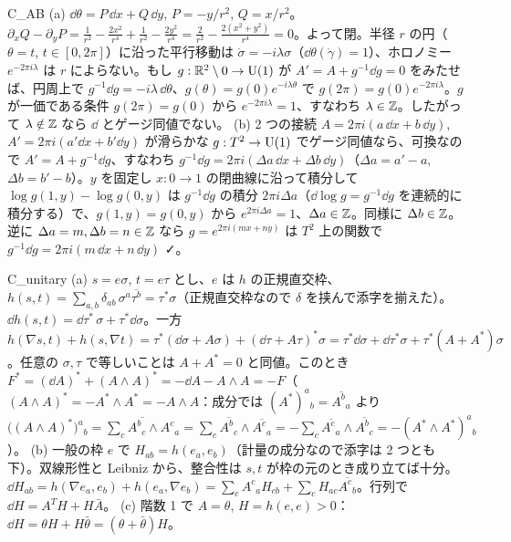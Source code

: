 \begin{soll}{C_AB}
(a) $\dd\theta=P\,\dd x+Q\,\dd y$, $P=-y/r^2$, $Q=x/r^2$。$\partial_xQ-\partial_yP=\frac1{r^2}-\frac{2x^2}{r^4}+\frac1{r^2}-\frac{2y^2}{r^4}=\frac2{r^2}-\frac{2(x^2+y^2)}{r^4}=0$。よって閉。半径 $r$ の円（$\theta=t$, $t\in[0,2\pi]$）に沿った平行移動は $\dot\sigma=-i\lambda\sigma$（$\dd\theta(\dot\gamma)=1$）、ホロノミー $e^{-2\pi i\lambda}$ は $r$ によらない。もし $g:\mathbb R^2\setminus0\to\mathrm{U}(1)$ が $A'=A+g^{-1}\dd g=0$ をみたせば、円周上で $g^{-1}\dd g=-i\lambda\,\dd\theta$、$g(\theta)=g(0)e^{-i\lambda\theta}$ で $g(2\pi)=g(0)e^{-2\pi i\lambda}$。$g$ が一価である条件 $g(2\pi)=g(0)$ から $e^{-2\pi i\lambda}=1$、すなわち $\lambda\in\mathbb Z$。したがって $\lambda\notin\mathbb Z$ なら $\dd$ とゲージ同値でない。
(b) 2 つの接続 $A=2\pi i(a\,\dd x+b\,\dd y)$, $A'=2\pi i(a'\dd x+b'\dd y)$ が滑らかな $g:T^2\to\mathrm{U}(1)$ でゲージ同値なら、可換なので $A'=A+g^{-1}\dd g$、すなわち $g^{-1}\dd g=2\pi i(\Delta a\,\dd x+\Delta b\,\dd y)$（$\Delta a=a'-a$, $\Delta b=b'-b$）。$y$ を固定し $x:0\to1$ の閉曲線に沿って積分して $\log g(1,y)-\log g(0,y)$ は $g^{-1}\dd g$ の積分 $2\pi i\Delta a$（$\dd\log g=g^{-1}\dd g$ を連続的に積分する）で、$g(1,y)=g(0,y)$ から $e^{2\pi i\Delta a}=1$、$\Delta a\in\mathbb Z$。同様に $\Delta b\in\mathbb Z$。逆に $\Delta a=m,\Delta b=n\in\mathbb Z$ なら $g=e^{2\pi i(mx+ny)}$ は $T^2$ 上の関数で $g^{-1}\dd g=2\pi i(m\,\dd x+n\,\dd y)$ ✓。
\end{soll}

\begin{soll}{C_unitary}
(a) $s=e\sigma$, $t=e\tau$ とし、$e$ は $h$ の正規直交枠、$h(s,t)=\sum_{a,b}\delta_{ab}\,\sigma^a\overline{\tau^b}=\tau^*\sigma$（正規直交枠なので $\delta$ を挟んで添字を揃えた）。$\dd h(s,t)=\dd\tau^*\,\sigma+\tau^*\dd\sigma$。一方 $h(\nabla s,t)+h(s,\nabla t)=\tau^*(\dd\sigma+A\sigma)+(\dd\tau+A\tau)^*\sigma=\tau^*\dd\sigma+\dd\tau^*\sigma+\tau^*(A+A^*)\sigma$。任意の $\sigma,\tau$ で等しいことは $A+A^*=0$ と同値。このとき $F^*=(\dd A)^*+(A\wedge A)^*=-\dd A-A\wedge A=-F$（$(A\wedge A)^*=-A^*\wedge A^*=-A\wedge A$：成分では $(A^*)^a{}_b=\overline{A^b{}_a}$ より $\bigl((A\wedge A)^*\bigr)^a{}_b=\overline{\sum_cA^b{}_c\wedge A^c{}_a}=\sum_c\overline{A^b{}_c}\wedge\overline{A^c{}_a}=-\sum_c\overline{A^c{}_a}\wedge\overline{A^b{}_c}=-(A^*\wedge A^*)^a{}_b$）。
(b) 一般の枠 $e$ で $H_{ab}=h(e_a,e_b)$（計量の成分なので添字は 2 つとも下）。双線形性と Leibniz から、整合性は $s,t$ が枠の元のとき成り立てば十分。$\dd H_{ab}=h(\nabla e_a,e_b)+h(e_a,\nabla e_b)=\sum_cA^c{}_aH_{cb}+\sum_cH_{ac}\overline{A^c{}_b}$。行列で $\dd H=A^TH+H\bar A$。
(c) 階数 1 で $A=\theta$, $H=h(e,e)>0$：$\dd H=\theta H+H\bar\theta=(\theta+\bar\theta)H$。
\end{soll}

